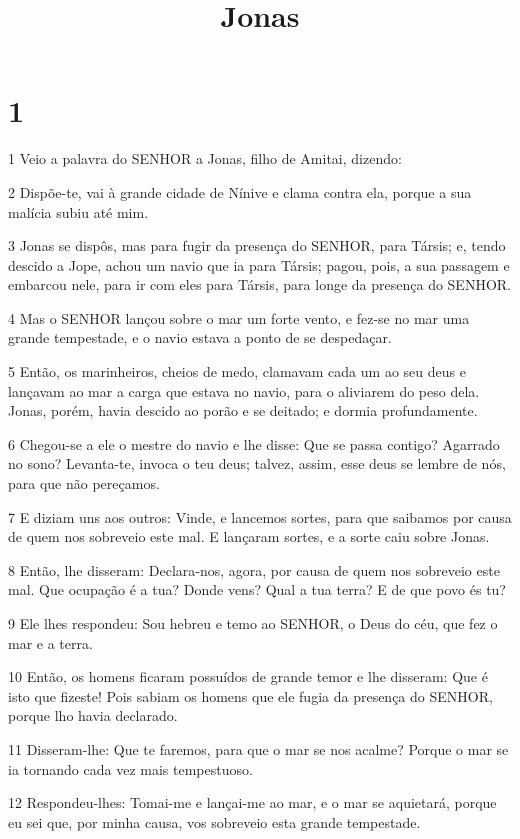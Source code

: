 

\title{Jonas}


\chapter{1}

\par 1 Veio a palavra do SENHOR a Jonas, filho de Amitai, dizendo:
\par 2 Dispõe-te, vai à grande cidade de Nínive e clama contra ela, porque a sua malícia subiu até mim.
\par 3 Jonas se dispôs, mas para fugir da presença do SENHOR, para Társis; e, tendo descido a Jope, achou um navio que ia para Társis; pagou, pois, a sua passagem e embarcou nele, para ir com eles para Társis, para longe da presença do SENHOR.
\par 4 Mas o SENHOR lançou sobre o mar um forte vento, e fez-se no mar uma grande tempestade, e o navio estava a ponto de se despedaçar.
\par 5 Então, os marinheiros, cheios de medo, clamavam cada um ao seu deus e lançavam ao mar a carga que estava no navio, para o aliviarem do peso dela. Jonas, porém, havia descido ao porão e se deitado; e dormia profundamente.
\par 6 Chegou-se a ele o mestre do navio e lhe disse: Que se passa contigo? Agarrado no sono? Levanta-te, invoca o teu deus; talvez, assim, esse deus se lembre de nós, para que não pereçamos.
\par 7 E diziam uns aos outros: Vinde, e lancemos sortes, para que saibamos por causa de quem nos sobreveio este mal. E lançaram sortes, e a sorte caiu sobre Jonas.
\par 8 Então, lhe disseram: Declara-nos, agora, por causa de quem nos sobreveio este mal. Que ocupação é a tua? Donde vens? Qual a tua terra? E de que povo és tu?
\par 9 Ele lhes respondeu: Sou hebreu e temo ao SENHOR, o Deus do céu, que fez o mar e a terra.
\par 10 Então, os homens ficaram possuídos de grande temor e lhe disseram: Que é isto que fizeste! Pois sabiam os homens que ele fugia da presença do SENHOR, porque lho havia declarado.
\par 11 Disseram-lhe: Que te faremos, para que o mar se nos acalme? Porque o mar se ia tornando cada vez mais tempestuoso.
\par 12 Respondeu-lhes: Tomai-me e lançai-me ao mar, e o mar se aquietará, porque eu sei que, por minha causa, vos sobreveio esta grande tempestade.
